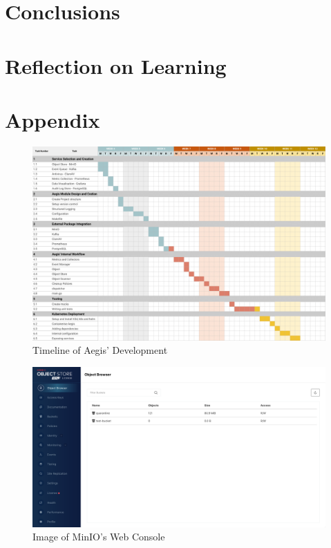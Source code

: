 \documentclass[12pt, conference, final, a4paper, onecolumn, compsoc]{IEEEtran}
\begin{document}
\section{Conclusions}
\subsection{}

\section{Reflection on Learning} %
\subsection{}

\section{Appendix}

\begin{figure}[H]
  \centering \includegraphics[scale=.65]{diagrams/gantt-chart.png}
  \caption{Timeline of Aegis' Development}
  \label{appendix:gantt}
\end{figure}

\begin{figure}[H]
  \centering \includegraphics[scale=.3]{images/minio-console.png}
  \caption{Image of MinIO's Web Console}
  \label{appendix:minio-console}
\end{figure}
\end{document}
